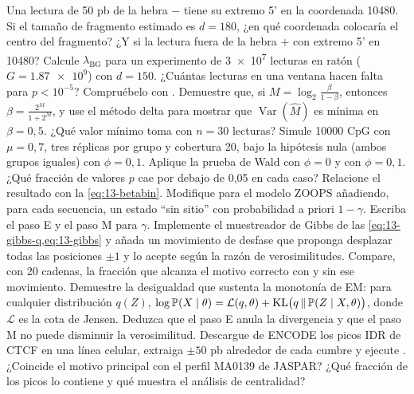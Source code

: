 \begin{ejercicios}
 Una lectura de 50 pb de la hebra $-$ tiene su extremo 5' en la coordenada \num{10480}. Si el tamaño de fragmento estimado es $d=180$, ¿en qué coordenada colocaría el centro del fragmento? ¿Y si la lectura fuera de la hebra $+$ con extremo 5' en \num{10480}?
 Calcule $\lambda_{\text{BG}}$ para un experimento de \num{3e7} lecturas en ratón ($G=\num{1.87e9}$) con $d=150$. ¿Cuántas lecturas en una ventana hacen falta para $p<10^{-5}$? Compruébelo con .
 Demuestre que, si $M=\log_2\frac{\beta}{1-\beta}$, entonces $\beta=\frac{2^M}{1+2^M}$, y use el método delta para mostrar que $\operatorname{Var}(\hat M)$ es mínima en $\beta=0{,}5$. ¿Qué valor mínimo toma con $n=30$ lecturas?
 Simule \num{10000} CpG con $\mu=0{,}7$, tres réplicas por grupo y cobertura 20, bajo la hipótesis nula (ambos grupos iguales) con $\phi=0{,}1$. Aplique la prueba de Wald con $\phi=0$ y con $\phi=0{,}1$. ¿Qué fracción de valores $p$ cae por debajo de 0,05 en cada caso? Relacione el resultado con la \cref{eq:13-betabin}.
 Modifique  para el modelo ZOOPS añadiendo, para cada secuencia, un estado ``sin sitio'' con probabilidad a priori $1-\gamma$. Escriba el paso E y el paso M para $\gamma$.
 Implemente el muestreador de Gibbs de las \cref{eq:13-gibbs-q,eq:13-gibbs} y añada un movimiento de desfase que proponga desplazar todas las posiciones $\pm1$ y lo acepte según la razón de verosimilitudes. Compare, con 20 cadenas, la fracción que alcanza el motivo correcto con y sin ese movimiento.
 Demuestre la desigualdad que sustenta la monotonía de EM: para cualquier distribución $q(Z)$, $\log\mathbb{P}(X\mid\theta)=\mathcal L(q,\theta)+\mathrm{KL}\bigl(q\,\|\,\mathbb{P}(Z\mid X,\theta)\bigr)$, donde $\mathcal L$ es la cota de Jensen. Deduzca que el paso E anula la divergencia y que el paso M no puede disminuir la verosimilitud.
 Descargue de ENCODE los picos IDR de CTCF en una línea celular, extraiga $\pm50$ pb alrededor de cada cumbre y ejecute . ¿Coincide el motivo principal con el perfil MA0139 de JASPAR? ¿Qué fracción de los picos lo contiene y qué muestra el análisis de centralidad?
\end{ejercicios}

